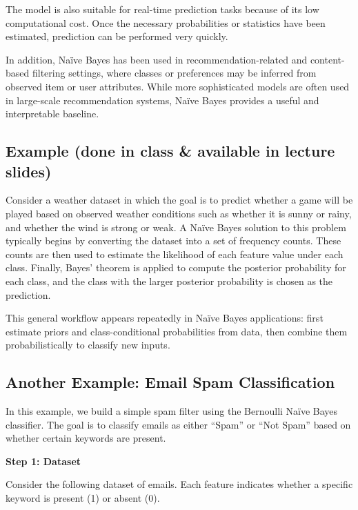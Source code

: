 \documentclass{article}
\begin{document}
The model is also suitable for real-time prediction tasks because of its low computational cost. Once the necessary probabilities or statistics have been estimated, prediction can be performed very quickly.

In addition, Na\"ive Bayes has been used in recommendation-related and content-based filtering settings, where classes or preferences may be inferred from observed item or user attributes. While more sophisticated models are often used in large-scale recommendation systems, Na\"ive Bayes provides a useful and interpretable baseline.

\subsection{Example (done in class \& available in lecture slides)}

Consider a weather dataset in which the goal is to predict whether a game will be played based on observed weather conditions such as whether it is sunny or rainy, and whether the wind is strong or weak. A Na\"ive Bayes solution to this problem typically begins by converting the dataset into a set of frequency counts. These counts are then used to estimate the likelihood of each feature value under each class. Finally, Bayes' theorem is applied to compute the posterior probability for each class, and the class with the larger posterior probability is chosen as the prediction.

This general workflow appears repeatedly in Na\"ive Bayes applications: first estimate priors and class-conditional probabilities from data, then combine them probabilistically to classify new inputs.

\subsection{Another Example: Email Spam Classification}

In this example, we build a simple spam filter using the Bernoulli Na\"ive Bayes classifier. The goal is to classify emails as either ``Spam'' or ``Not Spam'' based on whether certain keywords are present.

\noindent \textbf{Step 1: Dataset}

Consider the following dataset of emails. Each feature indicates whether a specific keyword is present (1) or absent (0).
\end{document}
